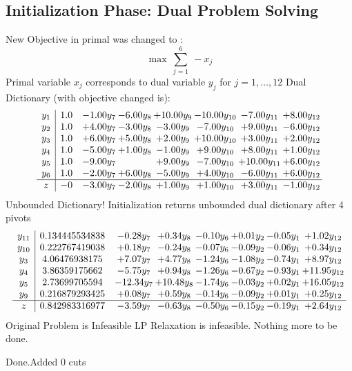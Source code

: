 \documentclass[8pt]{article}
\begin{document}
\subsection{Initialization Phase: Dual Problem Solving}
New Objective in primal was changed to : \[ \max\ \sum_{j=1}^{6}\ - x_j \] 
Primal variable $x_j$ corresponds to dual variable $y_j$ for $j = 1,\ldots,12$
Dual Dictionary (with objective changed is): 
\[\begin{array}{c| c c@{\hskip 2pt} c@{\hskip 2pt} c@{\hskip 2pt} c@{\hskip 2pt} c@{\hskip 2pt} c@{\hskip 2pt} }
 y_{1}   &  1.0 & -1.00 y_{7} & -6.00 y_{8} & + 10.00 y_{9} & -10.00 y_{10} & -7.00 y_{11} & +  8.00 y_{12}\\
 y_{2}   &  1.0 & +  4.00 y_{7} & -3.00 y_{8} & -3.00 y_{9} & -7.00 y_{10} & +  9.00 y_{11} & -6.00 y_{12}\\
 y_{3}   &  1.0 & +  6.00 y_{7} & +  5.00 y_{8} & +  2.00 y_{9} & + 10.00 y_{10} & +  3.00 y_{11} & +  2.00 y_{12}\\
 y_{4}   &  1.0 & -5.00 y_{7} & +  1.00 y_{8} & -1.00 y_{9} & +  9.00 y_{10} & +  8.00 y_{11} & +  1.00 y_{12}\\
 y_{5}   &  1.0 & -9.00 y_{7} &   & +  9.00 y_{9} & -7.00 y_{10} & + 10.00 y_{11} & +  6.00 y_{12}\\
 y_{6}   &  1.0 & -2.00 y_{7} & +  6.00 y_{8} & -5.00 y_{9} & +  4.00 y_{10} & -6.00 y_{11} & +  6.00 y_{12}\\
\hline
z    &  -0 & -3.00 y_{7} & -2.00 y_{8} & +  1.00 y_{9} & +  1.00 y_{10} & +  3.00 y_{11} & -1.00 y_{12}\\
\end{array}\]
Unbounded Dictionary!
Initialization returns unbounded dual dictionary after 4 pivots
\[\begin{array}{c| c c@{\hskip 2pt} c@{\hskip 2pt} c@{\hskip 2pt} c@{\hskip 2pt} c@{\hskip 2pt} c@{\hskip 2pt} }
 y_{11}   &  0.134445534838 & -0.28 y_{7} & +  0.34 y_{8} & -0.10 y_{6} & +  0.01 y_{2} & -0.05 y_{1} & +  1.02 y_{12}\\
 y_{10}   &  0.222767419038 & +  0.18 y_{7} & -0.24 y_{8} & -0.07 y_{6} & -0.09 y_{2} & -0.06 y_{1} & +  0.34 y_{12}\\
 y_{3}   &  4.06476938175 & +  7.07 y_{7} & +  4.77 y_{8} & -1.24 y_{6} & -1.08 y_{2} & -0.74 y_{1} & +  8.97 y_{12}\\
 y_{4}   &  3.86359175662 & -5.75 y_{7} & +  0.94 y_{8} & -1.26 y_{6} & -0.67 y_{2} & -0.93 y_{1} & + 11.95 y_{12}\\
 y_{5}   &  2.73699705594 & -12.34 y_{7} & + 10.48 y_{8} & -1.74 y_{6} & -0.03 y_{2} & +  0.02 y_{1} & + 16.05 y_{12}\\
 y_{9}   &  0.216879293425 & +  0.08 y_{7} & +  0.59 y_{8} & -0.14 y_{6} & -0.09 y_{2} & +  0.01 y_{1} & +  0.25 y_{12}\\
\hline
z    &  0.842983316977 & -3.59 y_{7} & -0.63 y_{8} & -0.50 y_{6} & -0.15 y_{2} & -0.19 y_{1} & +  2.64 y_{12}\\
\end{array}\]
Original Problem is Infeasible
 LP Relaxation is infeasible. Nothing more to be done. 

Done.Added 0 cuts 
\end{document}
